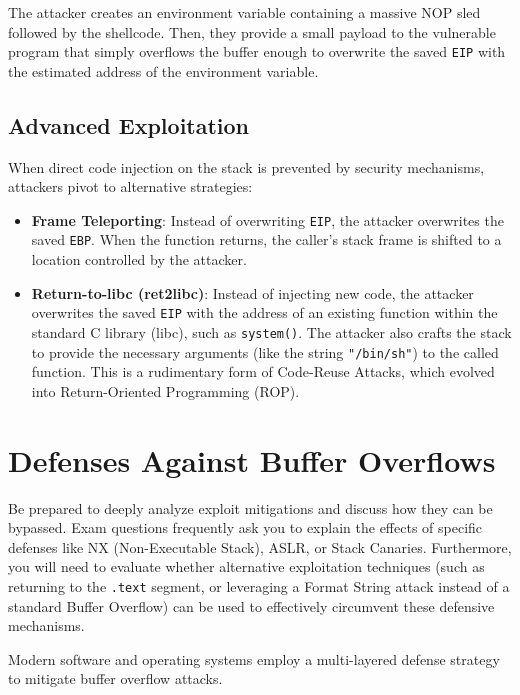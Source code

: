 The attacker creates an environment variable containing a massive NOP sled followed by the shellcode. Then, they provide a small payload to the vulnerable program that simply overflows the buffer enough to overwrite the saved \texttt{EIP} with the estimated address of the environment variable.

\subsection{Advanced Exploitation}
When direct code injection on the stack is prevented by security mechanisms, attackers pivot to alternative strategies:
\begin{itemize}
    \item \textbf{Frame Teleporting}: Instead of overwriting \texttt{EIP}, the attacker overwrites the saved \texttt{EBP}. When the function returns, the caller's stack frame is shifted to a location controlled by the attacker.
    \item \textbf{Return-to-libc (ret2libc)}: Instead of injecting new code, the attacker overwrites the saved \texttt{EIP} with the address of an existing function within the standard C library (libc), such as \texttt{system()}. The attacker also crafts the stack to provide the necessary arguments (like the string \texttt{"/bin/sh"}) to the called function. This is a rudimentary form of Code-Reuse Attacks, which evolved into Return-Oriented Programming (ROP).
\end{itemize}

\section{Defenses Against Buffer Overflows}

\begin{tcolorbox}[colback=blue!5!white,colframe=blue!75!black,title=Exam Insight]
Be prepared to deeply analyze exploit mitigations and discuss how they can be bypassed. Exam questions frequently ask you to explain the effects of specific defenses like NX (Non-Executable Stack), ASLR, or Stack Canaries. Furthermore, you will need to evaluate whether alternative exploitation techniques (such as returning to the \texttt{.text} segment, or leveraging a Format String attack instead of a standard Buffer Overflow) can be used to effectively circumvent these defensive mechanisms.
\end{tcolorbox}

Modern software and operating systems employ a multi-layered defense strategy to mitigate buffer overflow attacks.

